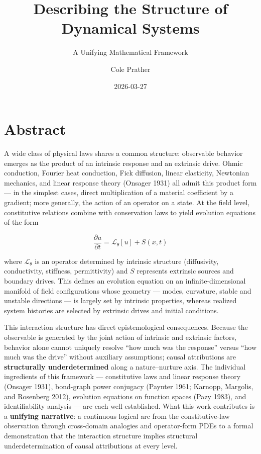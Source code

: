 \documentclass[
  letterpaper,
  DIV=11,
  numbers=noendperiod]{scrartcl}
\title{Describing the Structure of Dynamical Systems}
\subtitle{A Unifying Mathematical Framework}
\author{Cole Prather}
\date{2026-03-27}
\begin{document}
\maketitle


\section*{Abstract}\label{abstract}

A wide class of physical laws shares a common structure: observable
behavior emerges as the product of an intrinsic response and an
extrinsic drive. Ohmic conduction, Fourier heat conduction, Fick
diffusion, linear elasticity, Newtonian mechanics, and linear response
theory (Onsager 1931) all admit this product form --- in the simplest
cases, direct multiplication of a material coefficient by a gradient;
more generally, the action of an operator on a state. At the field
level, constitutive relations combine with conservation laws to yield
evolution equations of the form

\[\frac{\partial u}{\partial t} = \mathcal{L}_\theta[u] + S(x,t)\]

where \(\mathcal{L}_\theta\) is an operator determined by intrinsic
structure (diffusivity, conductivity, stiffness, permittivity) and \(S\)
represents extrinsic sources and boundary drives. This defines an
evolution equation on an infinite-dimensional manifold of field
configurations whose geometry --- modes, curvature, stable and unstable
directions --- is largely set by intrinsic properties, whereas realized
system histories are selected by extrinsic drives and initial
conditions.

This interaction structure has direct epistemological consequences.
Because the observable is generated by the joint action of intrinsic and
extrinsic factors, behavior alone cannot uniquely resolve ``how much was
the response'' versus ``how much was the drive'' without auxiliary
assumptions; causal attributions are \textbf{structurally
underdetermined} along a nature--nurture axis. The individual
ingredients of this framework --- constitutive laws and linear response
theory (Onsager 1931), bond-graph power conjugacy (Paynter 1961;
Karnopp, Margolis, and Rosenberg 2012), evolution equations on function
spaces (Pazy 1983), and identifiability analysis --- are each well
established. What this work contributes is a \textbf{unifying
narrative}: a continuous logical arc from the constitutive-law
observation through cross-domain analogies and operator-form PDEs to a
formal demonstration that the interaction structure implies structural
underdetermination of causal attributions at every level.
\end{document}
